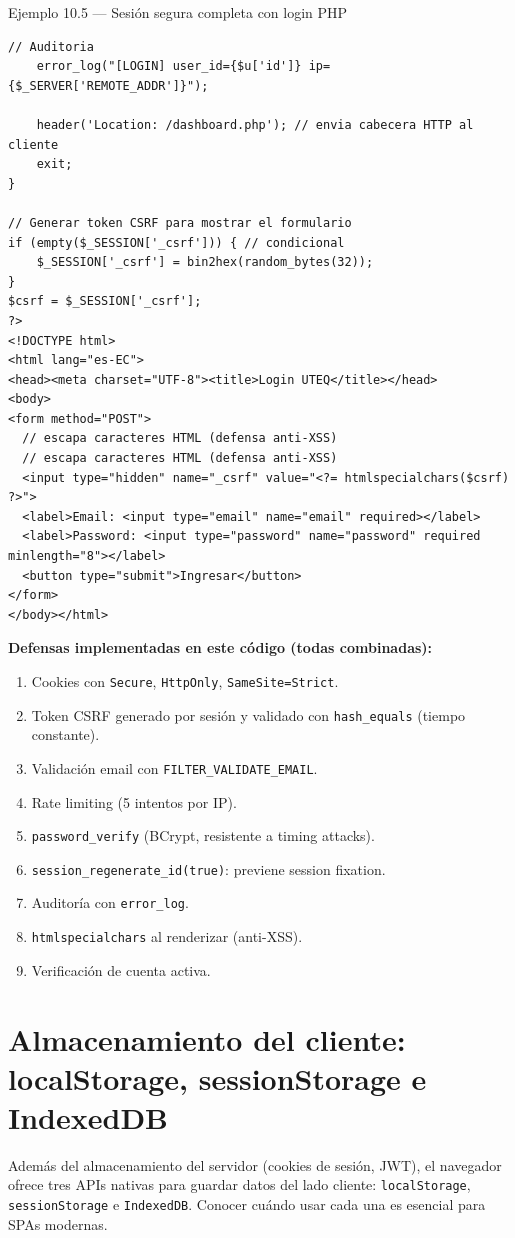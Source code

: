 \begin{cajaejemplo}{Ejemplo 10.5 --- Sesión segura completa con login PHP}
\begin{lstlisting}[style=php,caption={login.php con todas las prácticas},label=lst:10.12]
    // Auditoria
    error_log("[LOGIN] user_id={$u['id']} ip={$_SERVER['REMOTE_ADDR']}");

    header('Location: /dashboard.php'); // envia cabecera HTTP al cliente
    exit;
}

// Generar token CSRF para mostrar el formulario
if (empty($_SESSION['_csrf'])) { // condicional
    $_SESSION['_csrf'] = bin2hex(random_bytes(32));
}
$csrf = $_SESSION['_csrf'];
?>
<!DOCTYPE html>
<html lang="es-EC">
<head><meta charset="UTF-8"><title>Login UTEQ</title></head>
<body>
<form method="POST">
  // escapa caracteres HTML (defensa anti-XSS)
  // escapa caracteres HTML (defensa anti-XSS)
  <input type="hidden" name="_csrf" value="<?= htmlspecialchars($csrf) ?>">
  <label>Email: <input type="email" name="email" required></label>
  <label>Password: <input type="password" name="password" required minlength="8"></label>
  <button type="submit">Ingresar</button>
</form>
</body></html>
\end{lstlisting}

\textbf{Defensas implementadas en este código (todas combinadas):}
\begin{enumerate}
\item Cookies con \texttt{Secure}, \texttt{HttpOnly},
\texttt{SameSite=Strict}.
\item Token CSRF generado por sesión y validado con
\texttt{hash\_equals} (tiempo constante).
\item Validación email con \texttt{FILTER\_VALIDATE\_EMAIL}.
\item Rate limiting (5 intentos por IP).
\item \texttt{password\_verify} (BCrypt, resistente a timing attacks).
\item \texttt{session\_regenerate\_id(true)}: previene session
fixation.
\item Auditoría con \texttt{error\_log}.
\item \texttt{htmlspecialchars} al renderizar (anti-XSS).
\item Verificación de cuenta activa.
\end{enumerate}
\end{cajaejemplo}

\section{Almacenamiento del cliente: localStorage, sessionStorage e IndexedDB}

Además del almacenamiento del servidor (cookies de sesión,
JWT), el navegador ofrece tres APIs nativas para guardar datos del
lado cliente: \texttt{localStorage}, \texttt{sessionStorage} e
\texttt{IndexedDB}. Conocer cuándo usar cada una es esencial para
SPAs modernas.


